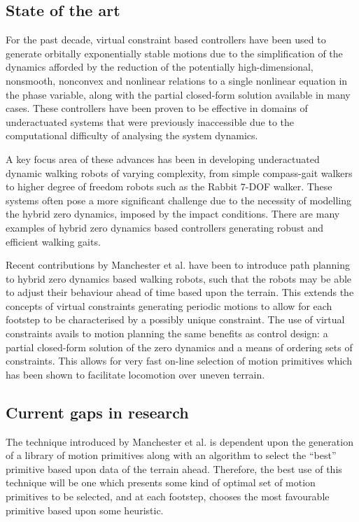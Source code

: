 \subsection{State of the art}
For the past decade, virtual constraint based controllers have been used to generate orbitally exponentially stable motions due to the simplification of the dynamics afforded by the reduction of the potentially high-dimensional, nonsmooth, nonconvex and  nonlinear relations to a single nonlinear equation in the phase variable, along with the partial closed-form solution available in many cases. These controllers have been proven to be effective in domains of underactuated systems that were previously inaccessible due to the computational difficulty of analysing the system dynamics. 

A key focus area of these advances has been in developing underactuated dynamic walking robots of varying complexity, from simple compass-gait walkers to higher degree of freedom robots such as the Rabbit 7-DOF walker. These systems often pose a more significant challenge due to the necessity of modelling the hybrid zero dynamics, imposed by the impact conditions. There are many examples of hybrid zero dynamics based controllers generating robust and efficient walking gaits. 

Recent contributions by Manchester et al. \cite{manchester13planning} have been to introduce path planning to hybrid zero dynamics based walking robots, such that the robots may be able to adjust their behaviour ahead of time based upon the terrain. This extends the concepts of virtual constraints generating periodic motions to allow for each footstep to be characterised by a possibly unique constraint. The use of virtual constraints avails to motion planning the same benefits as control design: a partial closed-form solution of the zero dynamics and a means of ordering sets of constraints. This allows for very fast on-line selection of motion primitives which has been shown to facilitate locomotion over uneven terrain.

\subsection{Current gaps in research}
The technique introduced by Manchester et al. \cite{manchester13planning} is dependent upon the generation of a library of motion primitives along with an algorithm to select the ``best'' primitive based upon data of the terrain ahead. Therefore, the best use of this technique will be one which presents some kind of optimal set of motion primitives to be selected, and at each footstep, chooses the most favourable primitive based upon some heuristic. 

